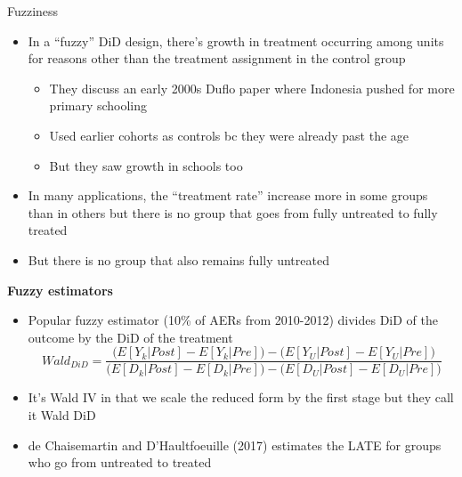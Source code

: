 \documentclass{beamer}
\begin{document}
\begin{frame}{Fuzziness}

\begin{itemize}
\item In a ``fuzzy'' DiD design, there's growth in treatment occurring among units for reasons other than the treatment assignment in the control group
	\begin{itemize}
	\item They discuss an early 2000s Duflo paper where Indonesia pushed for more primary schooling
	\item Used earlier cohorts as controls bc they were already past the age
	\item But they saw growth in schools too
	\end{itemize}
\item In many applications, the ``treatment rate'' increase more in some groups than in others but there is no group that goes from fully untreated to fully treated
\item But there is no group that also remains fully untreated

\end{itemize}

\end{frame}

\begin{frame}[shrink=10,plain]
\begin{center}
\textbf{Fuzzy estimators}
\end{center}

\begin{itemize}
\item Popular fuzzy estimator (10\% of AERs from 2010-2012) divides DiD of the outcome by the DiD of the treatment 
$$ Wald_{DiD} =  \frac{ 
\bigg (
E[Y_k|Post] - E[Y_k|Pre] \bigg ) - 
\bigg ( E[Y_U|Post] - E[Y_U|Pre] \bigg)
 }
 { \bigg ( 
 E[D_k|Post] - E[D_k|Pre] \bigg) - 
 \bigg ( E[D_U | Post] - E[D_U | Pre] \bigg )} 
$$
\item It's Wald IV in that we scale the reduced form by the first stage but they call it Wald DiD
\item de Chaisemartin and D'Haultfoeuille (2017) estimates the LATE for groups who go from untreated to treated
\end{itemize}

\end{frame}
\end{document}

